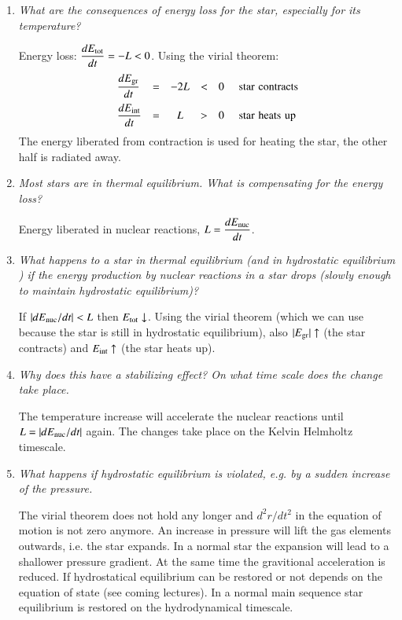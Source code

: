 \documentclass[11pt,a4paper]{report}
\begin{document}
\begin{enumerate}
\begin{enumerate}
  \item {\it What are the consequences of energy loss for the star,
      especially for its temperature?}
    
    Energy loss: $\displaystyle \frac{dE_{\rm tot}}{dt} = -L < 0$.
    Using the virial theorem:
    \begin{equation}
      \begin{array}{lccccl}
        \displaystyle
        \frac{dE_{\rm gr}}{dt} &=& -2L& <& 0& \,\,\rm{star \, \,contracts} \\[2ex]
        \displaystyle
        \frac{dE_{\rm int}}{dt}& =& L&  >& 0& \,\,\rm{star} \,\, \rm{heats} \,\, \rm {up} \\
      \end{array}
    \end{equation}
    The energy liberated from contraction is used for heating the star,
    the other half is radiated away.

  \item {\it Most stars are in thermal equilibrium. What is
      compensating for the energy loss?}
    
    Energy liberated in nuclear reactions, $L =
    \displaystyle\frac{dE_{\rm nuc}}{dt}$.
    
  \item {\it What happens to a star in thermal equilibrium (and in
      hydrostatic equilibrium ) if the energy production by nuclear
      reactions in a star drops (slowly enough to maintain hydrostatic
      equilibrium)?}
    
    If $|dE_{\rm nuc}/dt| < L$ then $E_{\rm tot} \downarrow $. Using
    the virial theorem (which we can use because the star is still in
    hydrostatic equilibrium), also $|E_{\rm gr}| \uparrow $ (the star
    contracts) and $E_{\rm int} \uparrow $ (the star heats up).

  \item {\it Why does this have a stabilizing effect? On what time
      scale does the change take place.}

    The temperature increase will accelerate the nuclear reactions
    until $L = |dE_{\rm nuc}/dt|$ again. The changes take place on the
    Kelvin Helmholtz timescale.

  \item {\it What happens if hydrostatic equilibrium is violated, e.g.
      by a sudden increase of the pressure.}
    
    The virial theorem does not hold any longer and $d^2r/dt^2$ in the
    equation of motion is not zero anymore.  An increase in pressure
    will lift the gas elements outwards, i.e.  the star expands.  In a
    normal star the expansion will lead to a shallower pressure
    gradient. At the same time the gravitional acceleration is
    reduced. If hydrostatical equilibrium can be restored or not
    depends on the equation of state (see coming lectures). In a
    normal main sequence star equilibrium is restored on the
    hydrodynamical timescale.


\end{enumerate}
\end{enumerate}
\end{document}
